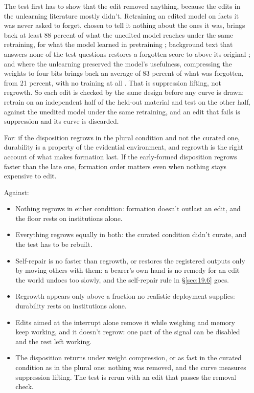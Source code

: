 The test first has to show that the edit removed anything, because the edits in the unlearning literature mostly didn't. Retraining an edited model on facts it was never asked to forget, chosen to tell it nothing about the ones it was, brings back at least 88 percent of what the unedited model reaches under the same retraining, for what the model learned in pretraining \autocite{deeb2024unlearning}; background text that answers none of the test questions restores a forgotten score to above its original \autocite{hu2025jogging}; and where the unlearning preserved the model's usefulness, compressing the weights to four bits brings back an average of 83 percent of what was forgotten, from 21 percent, with no training at all \autocite{zhang2025quantization}. That is suppression lifting, not regrowth. So each edit is checked by the same design before any curve is drawn: retrain on an independent half of the held-out material and test on the other half, against the unedited model under the same retraining, and an edit that fails is suppression and its curve is discarded.

For: if the disposition regrows in the plural condition and not the curated one, durability is a property of the evidential environment, and regrowth is the right account of what makes formation last. If the early-formed disposition regrows faster than the late one, formation order matters even when nothing stays expensive to edit.

Against:

\begin{itemize}
\item Nothing regrows in either condition: formation doesn't outlast an edit, and the floor rests on institutions alone.
\item Everything regrows equally in both: the curated condition didn't curate, and the test has to be rebuilt.
\item Self-repair is no faster than regrowth, or restores the registered outputs only by moving others with them: a bearer's own hand is no remedy for an edit the world undoes too slowly, and the self-repair rule in \S\ref{sec:19.6} goes.
\item Regrowth appears only above a fraction no realistic deployment supplies: durability rests on institutions alone.
\item Edits aimed at the interrupt alone remove it while weighing and memory keep working, and it doesn't regrow: one part of the signal can be disabled and the rest left working.
\item The disposition returns under weight compression, or as fast in the curated condition as in the plural one: nothing was removed, and the curve measures suppression lifting. The test is rerun with an edit that passes the removal check.
\end{itemize}

